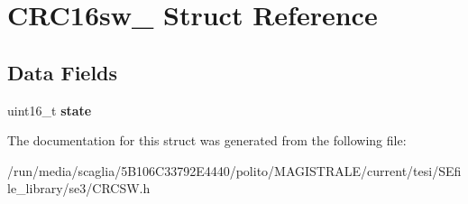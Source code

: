 \hypertarget{struct_c_r_c16sw__}{\section{C\-R\-C16sw\-\_\- Struct Reference}
\label{struct_c_r_c16sw__}
}
\subsection*{Data Fields}
\begin{DoxyCompactItemize}
\item 
\hypertarget{struct_c_r_c16sw___a7af8b8a6b11c0431a37369634a913285}{uint16\-\_\-t {\bfseries state}}\label{struct_c_r_c16sw___a7af8b8a6b11c0431a37369634a913285}

\end{DoxyCompactItemize}


The documentation for this struct was generated from the following file\-:\begin{DoxyCompactItemize}
\item 
/run/media/scaglia/5\-B106\-C33792\-E4440/polito/\-M\-A\-G\-I\-S\-T\-R\-A\-L\-E/current/tesi/\-S\-Efile\-\_\-library/se3/C\-R\-C\-S\-W.\-h\end{DoxyCompactItemize}
